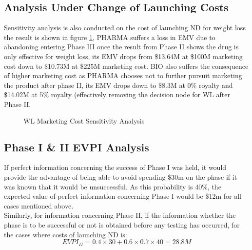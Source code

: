 \documentclass[journal]{IEEEtran}
\begin{document}
\subsection{Analysis Under Change of Launching Costs}
Sensitivity analysis is also conducted on the cost of launching ND for weight loss the result is shown in figure \ref{fig:wls}, PHARMA suffers a loss in EMV due to abandoning entering Phase III once the result from Phase II shows the drug is only effective for weight loss, its EMV drops from \$13.64M at \$100M marketing cost down to \$10.73M at \$225M marketing cost. BIO also suffers the consequence of higher marketing cost as PHARMA chooses not to further pursuit marketing the product after phase II, its EMV drops down to \$8.3M at 0\% royalty and \$14.02M at 5\% royalty (effectively removing the decision node for WL after Phase II.
\begin{figure}[H]
    \centering
    \caption{WL Marketing Cost Sensitivity Analysis}
    \label{fig:wls}
\end{figure}

\subsection{Phase I \& II EVPI Analysis}
If perfect information concerning the success of Phase I was held, it would provide the advantage of being able to avoid spending \$30m on the phase if it was known that it would be unsuccessful. As this probability is 40\%, the expected value of perfect information concerning Phase I would be \$12m for all cases mentioned above. \\
Similarly, for information concerning Phase II, if the information whether the phase is to be successful or not is obtained before any testing has occurred, for the cases where costs of launching ND is:
$$
EVPI_{II} = 0.4\times 30 + 0.6\times  0.7\times 40 = 28.8M 
$$
\end{document}
